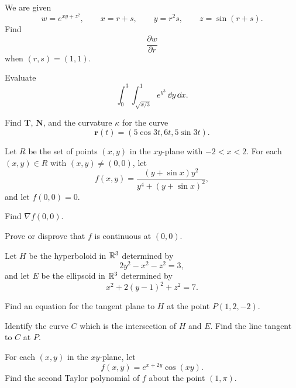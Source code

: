 \begin{problem}
We are given
\[
w=e^{xy+z^2},
\qquad
x=r+s,
\qquad
y=r^2s,
\qquad
z=\sin(r+s).
\]
Find
\[
\frac{\partial w}{\partial r}
\]
when $(r,s)=(1,1)$.
\end{problem}

\begin{problem}
Evaluate
\[
\int_0^3\int_{\sqrt{x/3}}^1 e^{y^3}\,\dd y\,\dd x.
\]
\end{problem}

\begin{problem}
Find $\mathbf T$, $\mathbf N$, and the curvature $\kappa$ for the curve
\[
\mathbf r(t)=(5\cos 3t,6t,5\sin 3t).
\]
\end{problem}

\begin{problem}
Let $R$ be the set of points $(x,y)$ in the $xy$-plane with $-2<x<2$. For each $(x,y)\in R$ with $(x,y)\ne(0,0)$, let
\[
f(x,y)=\frac{(y+\sin x)y^2}{y^4+(y+\sin x)^2},
\]
and let $f(0,0)=0$.
\begin{problemsubparts}
\item Find $\nabla f(0,0)$.
\item Prove or disprove that $f$ is continuous at $(0,0)$.
\end{problemsubparts}
\end{problem}

\begin{problem}
Let $H$ be the hyperboloid in $\mathbb{R}^3$ determined by
\[
2y^2-x^2-z^2=3,
\]
and let $E$ be the ellipsoid in $\mathbb{R}^3$ determined by
\[
x^2+2(y-1)^2+z^2=7.
\]
\begin{problemsubparts}
\item Find an equation for the tangent plane to $H$ at the point $P(1,2,-2)$.
\item Identify the curve $C$ which is the intersection of $H$ and $E$. Find the line tangent to $C$ at $P$.
\end{problemsubparts}
\end{problem}

\begin{problem}
For each $(x,y)$ in the $xy$-plane, let
\[
f(x,y)=e^{x+2y}\cos(xy).
\]
Find the second Taylor polynomial of $f$ about the point $(1,\pi)$.
\end{problem}

